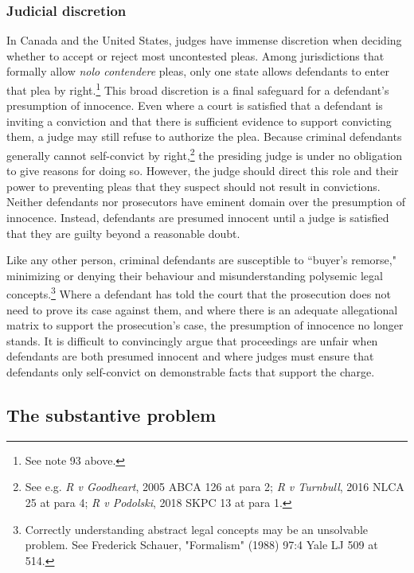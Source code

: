 \subsubsection{Judicial discretion}

In Canada and the United States, judges have immense discretion when deciding whether to accept or reject most uncontested pleas. Among jurisdictions that formally allow \textit{nolo contendere} pleas, only one state allows defendants to enter that plea by right.\footnote{See note 93 above.} This broad discretion is a final safeguard for a defendant's presumption of innocence. Even where a court is satisfied that a defendant is inviting a conviction and that there is sufficient evidence to support convicting them, a judge may still refuse to authorize the plea. Because criminal defendants generally cannot self-convict by right,\footnote{See e.g. \textit{R v Goodheart}, 2005 ABCA 126 at para 2; \textit{R v Turnbull}, 2016 NLCA 25 at para 4; \textit{R v Podolski}, 2018 SKPC 13 at para 1.} the presiding judge is under no obligation to give reasons for doing so. However, the judge should direct this role and their power to preventing pleas that they suspect should not result in convictions. Neither defendants nor prosecutors have eminent domain over the presumption of innocence. Instead, defendants are presumed innocent until a judge is satisfied that they are guilty beyond a reasonable doubt.

Like any other person, criminal defendants are susceptible to ``buyer's remorse," minimizing or denying their behaviour and misunderstanding polysemic legal concepts.\footnote{Correctly understanding abstract legal concepts may be an unsolvable problem. See Frederick Schauer, "Formalism" (1988) 97:4 Yale LJ 509 at 514.} Where a defendant has told the court that the prosecution does not need to prove its case against them, and where there is an adequate allegational matrix to support the prosecution's case, the presumption of innocence no longer stands. It is difficult to convincingly argue that proceedings are unfair when defendants are both presumed innocent and where judges must ensure that defendants only self-convict on demonstrable facts that support the charge.

\subsection{The substantive problem}

